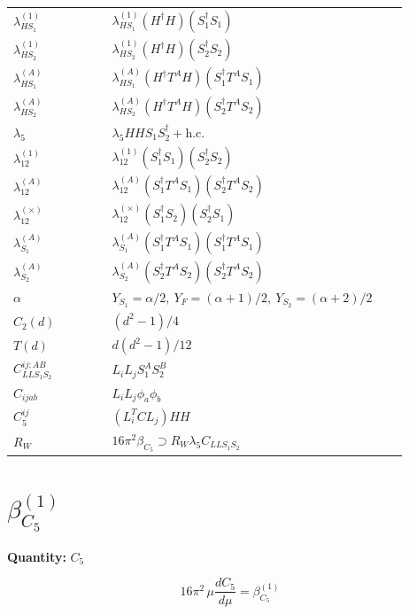 \documentclass[8pt]{article}
\begin{document}
\begin{landscape}
\begin{longtable}{@{}p{0.23\linewidth}p{0.69\linewidth}@{}}
$\lambda_{HS_1}^{(1)}$ & $\lambda_{HS_1}^{(1)}(H^\dagger H)(S_1^\dagger S_1)$ \\
$\lambda_{HS_2}^{(1)}$ & $\lambda_{HS_2}^{(1)}(H^\dagger H)(S_2^\dagger S_2)$ \\
$\lambda_{HS_1}^{(A)}$ & $\lambda_{HS_1}^{(A)}(H^\dagger T^AH)(S_1^\dagger T^AS_1)$ \\
$\lambda_{HS_2}^{(A)}$ & $\lambda_{HS_2}^{(A)}(H^\dagger T^AH)(S_2^\dagger T^AS_2)$ \\
$\lambda_5$ & $\lambda_5HHS_1S_2^\dagger+\mathrm{h.c.}$ \\
$\lambda_{12}^{(1)}$ & $\lambda_{12}^{(1)}(S_1^\dagger S_1)(S_2^\dagger S_2)$ \\
$\lambda_{12}^{(A)}$ & $\lambda_{12}^{(A)}(S_1^\dagger T^AS_1)(S_2^\dagger T^AS_2)$ \\
$\lambda_{12}^{(\times)}$ & $\lambda_{12}^{(\times)}(S_1^\dagger S_2)(S_2^\dagger S_1)$ \\
$\lambda_{S_1}^{(A)}$ & $\lambda_{S_1}^{(A)}(S_1^\dagger T^A S_1)(S_1^\dagger T^A S_1)$ \\
$\lambda_{S_2}^{(A)}$ & $\lambda_{S_2}^{(A)}(S_2^\dagger T^A S_2)(S_2^\dagger T^A S_2)$ \\
$\alpha$ & $Y_{S_1}=\alpha/2,\ Y_F=(\alpha+1)/2,\ Y_{S_2}=(\alpha+2)/2$ \\
$C_2(d)$ & $(d^2-1)/4$ \\
$T(d)$ & $d(d^2-1)/12$ \\
$C_{LLS_1S_2}^{ij;AB}$ & $L_iL_jS_1^AS_2^B$ \\
$C_{ijab}$ & $L_iL_j\phi_a\phi_b$ \\
$C_5^{ij}$ & $(L_i^TCL_j)HH$ \\
$R_W$ & $16\pi^2\beta_{C_5}\supset R_W\lambda_5C_{LLS_1S_2}$ \\
\bottomrule
\end{longtable}
\section*{$\beta_{C_5}^{(1)}$}
\noindent\textbf{Quantity: }$C_5$\par\smallskip
\[16\pi^2\,\mu\frac{dC_5}{d\mu}=\beta_{C_5}^{(1)}\]

\end{landscape}
\end{document}
